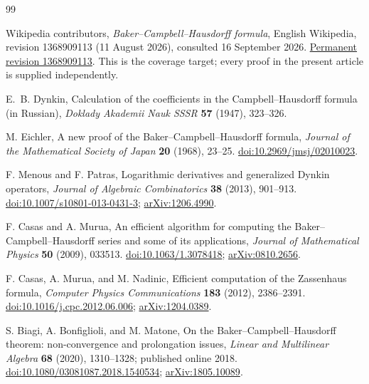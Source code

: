 \begingroup\small
\begin{thebibliography}{99}
\setlength{\itemsep}{3pt}
\setlength{\parskip}{0pt}

Wikipedia contributors,
\emph{Baker--Campbell--Hausdorff formula}, English Wikipedia, revision
1368909113 (11 August 2026), consulted 16 September 2026.
\href{https://en.wikipedia.org/w/index.php?oldid=1368909113}{Permanent revision 1368909113}.
This is the coverage target; every proof in the present article is supplied
independently.

E.~B. Dynkin,
Calculation of the coefficients in the Campbell--Hausdorff formula (in Russian),
\emph{Doklady Akademii Nauk SSSR} \textbf{57} (1947), 323--326.

M. Eichler,
A new proof of the Baker--Campbell--Hausdorff formula,
\emph{Journal of the Mathematical Society of Japan} \textbf{20} (1968), 23--25.
\href{https://doi.org/10.2969/jmsj/02010023}{doi:10.2969/jmsj/02010023}.

F. Menous and F. Patras,
Logarithmic derivatives and generalized Dynkin operators,
\emph{Journal of Algebraic Combinatorics} \textbf{38} (2013), 901--913.
\href{https://doi.org/10.1007/s10801-013-0431-3}{doi:10.1007/s10801-013-0431-3};
\href{https://arxiv.org/abs/1206.4990}{arXiv:1206.4990}.

F. Casas and A. Murua,
An efficient algorithm for computing the Baker--Campbell--Hausdorff series
and some of its applications,
\emph{Journal of Mathematical Physics} \textbf{50} (2009), 033513.
\href{https://doi.org/10.1063/1.3078418}{doi:10.1063/1.3078418};
\href{https://arxiv.org/abs/0810.2656}{arXiv:0810.2656}.

F. Casas, A. Murua, and M. Nadinic,
Efficient computation of the Zassenhaus formula,
\emph{Computer Physics Communications} \textbf{183} (2012), 2386--2391.
\href{https://doi.org/10.1016/j.cpc.2012.06.006}{doi:10.1016/j.cpc.2012.06.006};
\href{https://arxiv.org/abs/1204.0389}{arXiv:1204.0389}.

S. Biagi, A. Bonfiglioli, and M. Matone,
On the Baker--Campbell--Hausdorff theorem: non-convergence and prolongation issues,
\emph{Linear and Multilinear Algebra} \textbf{68} (2020), 1310--1328;
published online 2018.
\href{https://doi.org/10.1080/03081087.2018.1540534}{doi:10.1080/03081087.2018.1540534};
\href{https://arxiv.org/abs/1805.10089}{arXiv:1805.10089}.


\end{thebibliography}

